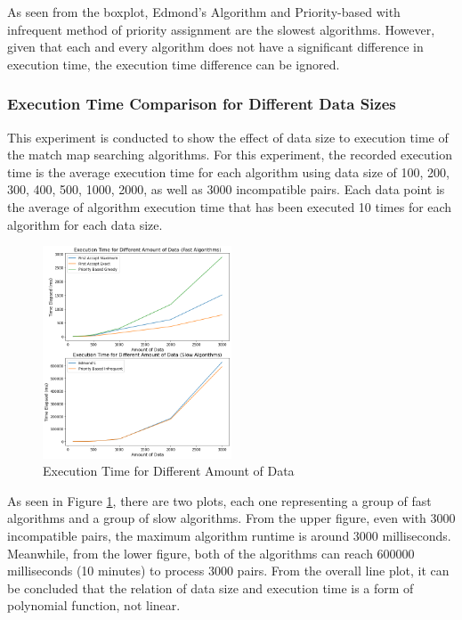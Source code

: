 \documentclass[conference]{IEEEtran}
\begin{document}
As seen from the boxplot, Edmond's Algorithm and Priority-based with infrequent method of priority assignment are the slowest
algorithms. However, given that each and every algorithm does not have a significant difference in execution time, the execution
time difference can be ignored.

\subsubsection{Execution Time Comparison for Different Data Sizes}
This experiment is conducted to show the effect of data size to execution time of the match map searching algorithms. For this
experiment, the recorded execution time is the average execution time for each algorithm using data size of  100, 200, 300, 400,
500, 1000, 2000, as well as 3000 incompatible pairs. Each data point is the average of algorithm execution time that has been
executed 10 times for each algorithm for each data size.

\begin{figure}[h]
    \includegraphics[width=0.5\textwidth]{images/execution_time_for_different_amount_of_data.png}
    \caption{Execution Time for Different Amount of Data}
    \label{exctimedata}
\end{figure}

As seen in Figure \ref{exctimedata}, there are two plots, each one representing a group of fast algorithms and a group of slow algorithms.
From the upper figure, even with 3000 incompatible pairs, the maximum algorithm runtime is around 3000 milliseconds. Meanwhile,
from the lower figure, both of the algorithms can reach 600000 milliseconds (10 minutes) to process 3000 pairs. From the
overall line plot, it can be concluded that the relation of data size and execution time is a form of polynomial function, not linear.
\end{document}
